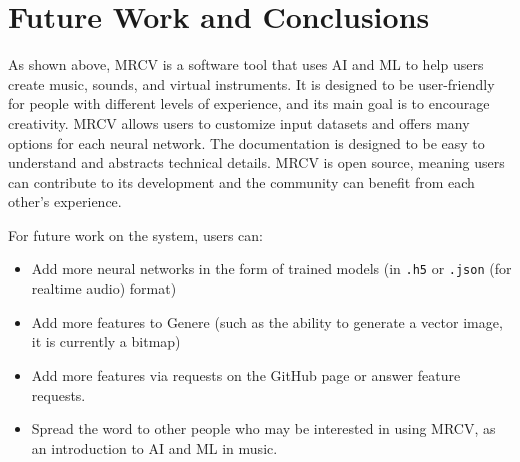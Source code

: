 \documentclass{article}
\begin{document}
\section{Future Work and Conclusions}
As shown above, MRCV is a software tool that uses AI and ML to help users create music, sounds, and virtual instruments. It is designed to be user-friendly for people with different levels of experience, and its main goal is to encourage creativity. MRCV allows users to customize input datasets and offers many options for each neural network. The documentation is designed to be easy to understand and abstracts technical details. MRCV is open source, meaning users can contribute to its development and the community can benefit from each other's experience.

For future work on the system, users can:
\begin{itemize}
	\item Add more neural networks in the form of trained models (in \texttt{.h5} or \texttt{.json} (for realtime audio) format)
	\item Add more features to Genere (such as the ability to generate a vector image, it is currently a bitmap)
	\item Add more features via requests on the GitHub page or answer feature requests.
	\item Spread the word to other people who may be interested in using MRCV, as an introduction to AI and ML in music.
\end{itemize}



\end{document}
